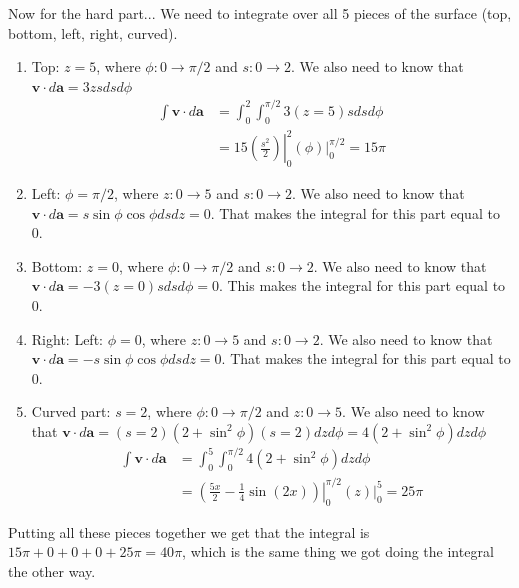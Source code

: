 \documentclass{homework}
\newcommand{\bs}[1]{\ensuremath{\boldsymbol{#1}}}
\newcommand{\arrowbounds}[3]{
   \ensuremath{
      #1: #2 \rightarrow #3
   }
   }
\newcommand{\intbounds}[3]{
   \ensuremath{
      \left. \left( #1 \right) \right|_{#2}^{#3}
   }
   }
\begin{document}
\begin{homeworkProblem}[Problem 1.43]
{\begin{enumerate}
        Now for the hard part... We need to integrate over all 5 pieces of the surface (top, bottom, left, right, curved).
        \begin{enumerate}
          \item Top: $z=5$, where $\arrowbounds{\phi}{0}{\pi/2}$ and $\arrowbounds{s}{0}{2}$. We also need to know that $\bs{v} \cdot d \bs{a} = 3z s ds d \phi$
            \begin{align*}
              \int \bs{v} \cdot d\bs{a} &= \int_0^2 \int_0 ^{\pi/2} 3 (z=5) s ds d \phi \\
                &= 15 \left. \left( \frac{s^2}{2} \right) \right|_0^2 \left. \left( \phi \right) \right|_0^{\pi/2} = 15 \pi
            \end{align*}
          \item Left: $\phi = \pi/2$, where $\arrowbounds{z}{0}{5}$ and $\arrowbounds{s}{0}{2}$. We also need to know that $\bs{v} \cdot d \bs{a} = s \sin \phi \cos \phi ds dz= 0$. That makes the integral for this part equal to 0.
          \item Bottom: $z=0$, where $\arrowbounds{\phi}{0}{\pi/2}$ and $\arrowbounds{s}{0}{2}$. We also need to know that $\bs{v} \cdot d \bs{a} = -3(z=0) s ds d \phi = 0$. This makes the integral for this part equal to 0.
          \item Right: Left: $\phi = 0$, where $\arrowbounds{z}{0}{5}$ and $\arrowbounds{s}{0}{2}$. We also need to know that $\bs{v} \cdot d \bs{a} =- s \sin \phi \cos \phi ds dz= 0$. That makes the integral for this part equal to 0.
          \item Curved part: $s=2$, where $\arrowbounds{\phi}{0}{\pi/2}$ and $\arrowbounds{z}{0}{5}$. We also need to know that $\bs{v} \cdot d \bs{a} = (s=2) (2 + \sin^2 \phi)(s=2) dz d \phi = 4 (2 + \sin^2 \phi) dz d \phi$
            \begin{align*}
              \int \bs{v} \cdot d\bs{a} &= \int_0^5 \int_0 ^{\pi/2} 4 (2 + \sin^2 \phi) dz d \phi \\
                &= \intbounds{\frac{5 x}{2}-\frac{1}{4} \sin (2 x)}{0}{\pi/2} \intbounds{z}{0}{5} =25 \pi
            \end{align*}
        \end{enumerate}

        Putting all these pieces together we get that the integral is $15 \pi + 0 + 0 + 0 + 25 \pi = 40 \pi$, which is the same thing we got doing the integral the other way.


\end{enumerate}}
\end{homeworkProblem}
\end{document}
